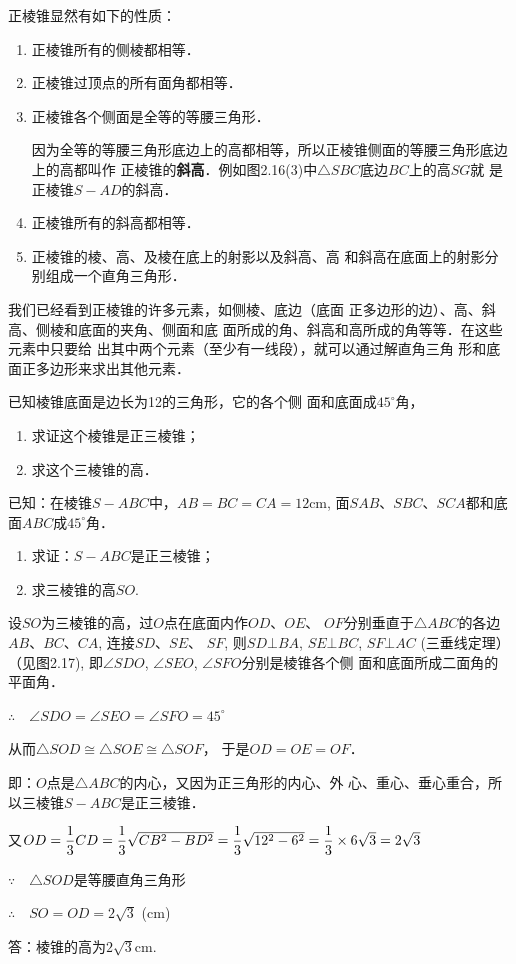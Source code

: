 正棱锥显然有如下的性质：
\begin{enumerate}
\item 正棱锥所有的侧棱都相等．
\item 正棱锥过顶点的所有面角都相等．
\item 正棱锥各个侧面是全等的等腰三角形．

因为全等的等腰三角形底边上的高都相等，所以正棱锥侧面的等腰三角形底边上的高都叫作
正棱锥的\textbf{斜高}．例如图2.16(3)中$\triangle SBC$底边$BC$上的高$SG$就
是正棱锥$S-AD$的斜高．
\item 正棱锥所有的斜高都相等．
\item 正棱锥的棱、高、及棱在底上的射影以及斜高、高
和斜高在底面上的射影分别组成一个直角三角形．
\end{enumerate}

我们已经看到正棱锥的许多元素，如侧棱、底边（底面
正多边形的边）、高、斜高、侧棱和底面的夹角、侧面和底
面所成的角、斜高和高所成的角等等．在这些元素中只要给
出其中两个元素（至少有一线段），就可以通过解直角三角
形和底面正多边形来求出其他元素．

\begin{example}
已知棱锥底面是边长为12的三角形，它的各个侧
面和底面成$45^{\circ}$角，
\begin{enumerate}
    \item 求证这个棱锥是正三棱锥；
    \item 求这个三棱锥的高．
\end{enumerate}

已知：在棱锥$S-ABC$中，$AB=BC=CA=12$cm, 
面$SAB$、$SBC$、$SCA$都和底面$ABC$成$45^{\circ}$角．
\begin{enumerate}
    \item 求证：$S-ABC$是正三棱锥；
    \item 求三棱锥的高$SO$.
\end{enumerate}
\end{example}

\begin{solution}
    设$SO$为三棱锥的高，过$O$点在底面内作$OD$、$OE$、
$OF$分别垂直于$\triangle ABC$的各边$AB$、$BC$、$CA$, 连接$SD$、$SE$、
$SF$, 则$SD\bot BA$, $SE\bot BC$, $SF\bot AC$ (三垂线定理）（见图2.17), 即$\angle SDO$, $\angle SEO$, $\angle SFO$分别是棱锥各个侧
面和底面所成二面角的平面角．

$\therefore\quad \angle SDO=\angle SEO=\angle SFO=45^{\circ}$

从而$\triangle SOD\cong \triangle SOE\cong \triangle SOF$，
于是$OD=OE=OF$．

即：$O$点是$\triangle ABC$的内心，又因为正三角形的内心、外
心、重心、垂心重合，所以三棱锥$S-ABC$是正三棱锥．

又$OD=\dfrac{1}{3}CD=\dfrac{1}{3}\sqrt{CB^2-BD^2}=\dfrac{1}{3}\sqrt{12^2-6^2}=\dfrac{1}{3}\times 6\sqrt{3}=2\sqrt{3}$

$\because\quad \triangle SOD$是等腰直角三角形

$\therefore\quad SO=OD=2\sqrt{3}$ (cm)

答：棱锥的高为$2\sqrt{3}$cm.
\end{solution}

